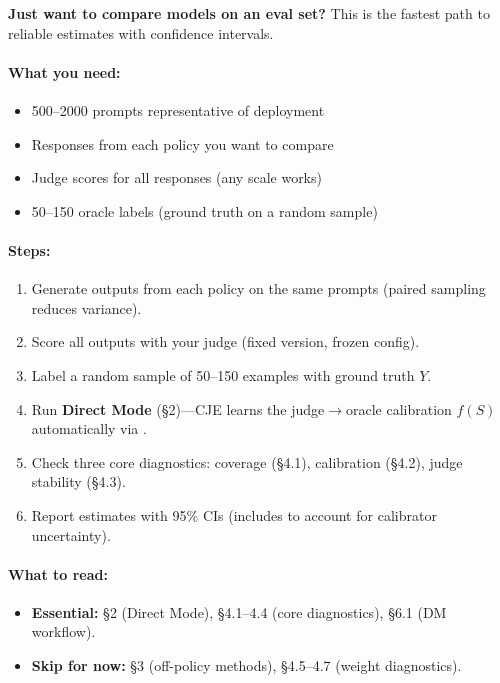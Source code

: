 \textbf{Just want to compare models on an eval set?} This is the fastest path to reliable estimates with confidence intervals.

\paragraph{What you need:}
\begin{itemize}
\item 500--2000 prompts representative of deployment
\item Responses from each policy you want to compare
\item Judge scores for all responses (any scale works)
\item 50--150 oracle labels (ground truth on a random sample)
\end{itemize}

\paragraph{Steps:}
\begin{enumerate}
\item Generate outputs from each policy on the same prompts (paired sampling reduces variance).
\item Score all outputs with your judge (fixed version, frozen config).
\item Label a random sample of 50--150 examples with ground truth $Y$.
\item Run \textbf{Direct Mode} (§2)---CJE learns the judge$\to$oracle calibration $f(S)$ automatically via \autocal.
\item Check three core diagnostics: coverage (§4.1), calibration (§4.2), judge stability (§4.3).
\item Report estimates with 95\% CIs (includes \oua{} to account for calibrator uncertainty).
\end{enumerate}

\paragraph{What to read:}
\begin{itemize}
\item \textbf{Essential:} §2 (Direct Mode), §4.1--4.4 (core diagnostics), §6.1 (DM workflow).
\item \textbf{Skip for now:} §3 (off-policy methods), §4.5--4.7 (weight diagnostics).
\end{itemize}


